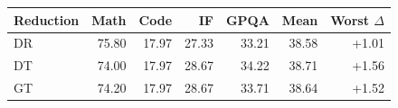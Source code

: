\begin{tabular}{lrrrrrr}
\toprule
Reduction & Math & Code & IF & GPQA & Mean & Worst $\Delta$ \\
\midrule
DR & 75.80 & 17.97 & 27.33 & 33.21 & 38.58 & +1.01 \\
DT & 74.00 & 17.97 & 28.67 & 34.22 & 38.71 & +1.56 \\
GT & 74.20 & 17.97 & 28.67 & 33.71 & 38.64 & +1.52 \\
\bottomrule
\end{tabular}
